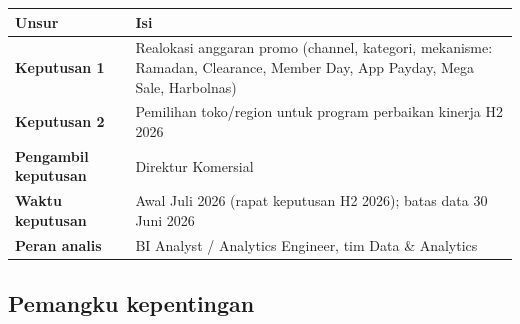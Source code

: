 \documentclass[10pt,a4paper]{article}
\begin{document}
{\def\LTcaptype{none} %
\begin{longtable}[]{@{}
  >{\raggedright\arraybackslash}p{}
  >{\raggedright\arraybackslash}p{}@{}}
\toprule\noalign{}
\begin{minipage}[b]{\linewidth}\raggedright
Unsur
\end{minipage} & \begin{minipage}[b]{\linewidth}\raggedright
Isi
\end{minipage} \\
\midrule\noalign{}
\endhead
\bottomrule\noalign{}
\endlastfoot
\textbf{Keputusan 1} & Realokasi anggaran promo (channel, kategori, mekanisme: Ramadan, Clearance, Member Day, App Payday, Mega Sale, Harbolnas) \\
\textbf{Keputusan 2} & Pemilihan toko/region untuk program perbaikan kinerja H2 2026 \\
\textbf{Pengambil keputusan} & Direktur Komersial \\
\textbf{Waktu keputusan} & Awal Juli 2026 (rapat keputusan H2 2026); batas data 30 Juni 2026 \\
\textbf{Peran analis} & BI Analyst / Analytics Engineer, tim Data \& Analytics \\
\end{longtable}
}

\subsection{Pemangku kepentingan}\label{pemangku-kepentingan}
\end{document}
